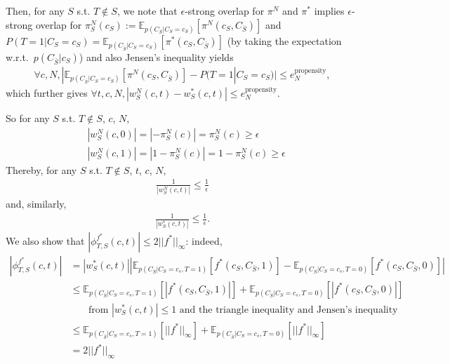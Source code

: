 \documentclass{article}
\theoremstyle{plain}
\theoremstyle{definition}
\theoremstyle{remark}
\theoremstyle{mystyle}
\newcommand{\coalitionshapley}[4]{\phi^{#1}_{#3,#2}(#4)}
\begin{document}
Then, for any $S$ s.t. $T \notin S$, we note that $\epsilon$-strong overlap for $\pi^N$ and $\pi^*$ implies $\epsilon$-strong overlap for $\pi^N_S(c_S) := \mathbb{E}_{p(C_{\bar{S}}|C_S=c_S)}[\pi^N(c_S,C_{\bar{S}})]$ and $P(T=1|C_S=c_S) = \mathbb{E}_{p(C_{\bar{S}}|C_S=c_S)}[\pi^*(c_S,C_{\bar{S}})]$ (by taking the expectation w.r.t.~$p(C_{\bar{S}} | c_S)$) and also Jensen's inequality yields
\begin{align*}
    \forall c, N, |\mathbb{E}_{p(C_{\bar{S}}|C_S=c_S)}[\pi^N(c_S,C_{\bar{S}})] -P(T=1|C_S=c_S) | \leq e^\text{propensity}_N,
\end{align*}
which further gives $\forall t, c, N, |w^N_S(c,t) - w^*_S(c,t) | \leq e^\text{propensity}_N$.

So for any $S$ s.t. $T \notin S$, $c$, $N$,
\begin{align*}
    &|w^N_S(c,0)| = |-\pi^N_S(c)| = \pi^N_S(c) \geq \epsilon \\
    &|w^N_S(c,1)| = |1-\pi^N_S(c)| = 1-\pi^N_S(c) \geq \epsilon
\end{align*}
Thereby, for any $S$ s.t. $T \notin S$, $t$, $c$, $N$,
\begin{align*}
    \frac{1}{|w^N_S(c,t)|} \leq \frac{1}{\epsilon}
\end{align*}
and, similarly,
\begin{align*}
    \frac{1}{|w^*_S(c,t)|} \leq \frac{1}{\epsilon}.
\end{align*}
We also show that $|\coalitionshapley{f^*}{S}{T}{c,t}| \leq 2||f^*||_\infty$: indeed,
\begin{align*}
    |\coalitionshapley{f^*}{S}{T}{c,t}|
    &= |w^*_S(c,t)| |\mathbb{E}_{p(C_{\bar{S}}|C_S=c_s,T=1)}[f^*(c_S,C_{\bar{S}},1)] - \mathbb{E}_{p(C_{\bar{S}}|C_S=c_s,T=0)}[f^*(c_S,C_{\bar{S}},0)]| \\
    &\leq \mathbb{E}_{p(C_{\bar{S}}|C_S=c_s,T=1)} [|f^*(c_S,C_{\bar{S}},1)|] + \mathbb{E}_{p(C_{\bar{S}}|C_S=c_s,T=0)} [|f^*(c_S,C_{\bar{S}},0)|] \\
    & \ \ \ \ \ \ \ \text{ from } |w^*_S(c,t)| \leq 1
     \text{ and the triangle inequality and Jensen's inequality} \\
     &\leq \mathbb{E}_{p(C_{\bar{S}}|C_S=c_s,T=1)} [||f^*||_\infty] + \mathbb{E}_{p(C_{\bar{S}}|C_S=c_s,T=0)} [||f^*||_\infty] \\
     &= 2 ||f^*||_\infty
\end{align*}
\end{document}
